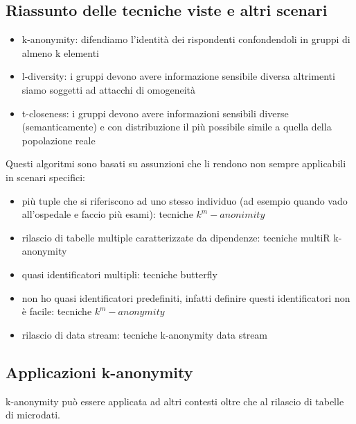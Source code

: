 \subsection{Riassunto delle tecniche viste e altri scenari}
\begin{itemize}
    \item k-anonymity: difendiamo l'identità dei rispondenti confondendoli in gruppi di almeno k elementi
    \item l-diversity: i gruppi devono avere informazione sensibile diversa altrimenti siamo soggetti ad attacchi di omogeneità
    \item t-closeness: i gruppi devono avere informazioni sensibili diverse (semanticamente) e con distribuzione il più possibile simile a quella della popolazione reale
\end{itemize}
Questi algoritmi sono basati su assunzioni che li rendono non sempre applicabili in scenari specifici:
\begin{itemize}
    \item più tuple che si riferiscono ad uno stesso individuo (ad esempio quando vado all'ospedale e faccio più esami): tecniche \(k^m -anonimity\)
    \item rilascio di tabelle multiple caratterizzate da dipendenze: tecniche multiR k-anonymity
    \item quasi identificatori multipli: tecniche butterfly
    \item non ho quasi identificatori predefiniti, infatti definire questi identificatori non è facile: tecniche \(k^m-anonymity\)
    \item rilascio di data stream: tecniche k-anonymity data stream
\end{itemize}
\subsection{Applicazioni k-anonymity}
k-anonymity può essere applicata ad altri contesti oltre che al rilascio di tabelle di microdati.
